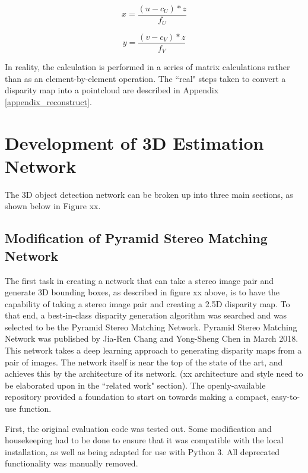 \begin{equation}
x = \frac{(u - c_U) * z}{f_U}
\end{equation}

\begin{equation}
y = \frac{(v - c_V) * z}{f_V}
\end{equation}

In reality, the calculation is performed in a series of matrix calculations rather than as an element-by-element operation. The ``real" steps taken to convert a disparity map into a pointcloud are described in Appendix \ref{appendix_reconstruct}.


\newpage
\section{Development of 3D Estimation Network}
The 3D object detection network can be broken up into three main sections, as shown below in Figure xx. 



\subsection{Modification of Pyramid Stereo Matching Network}
The first task in creating a network that can take a stereo image pair and generate 3D bounding boxes, as described in figure xx above, is to have the capability of taking a stereo image pair and creating a 2.5D disparity map. To that end, a best-in-class disparity generation algorithm was searched and was selected to be the Pyramid Stereo Matching Network. Pyramid Stereo Matching Network was published by Jia-Ren Chang and Yong-Sheng Chen in March 2018. This network takes a deep learning approach to generating disparity maps from a pair of images. The network itself is near the top of the state of the art, and achieves this by the architecture of its network. (xx architecture and style need to be elaborated upon in the ``related work" section). The openly-available repository provided a foundation to start on towards making a compact, easy-to-use function.

First, the original evaluation code was tested out. Some modification and housekeeping had to be done to ensure that it was compatible with the local installation, as well as being adapted for use with Python 3. All deprecated functionality was manually removed.

